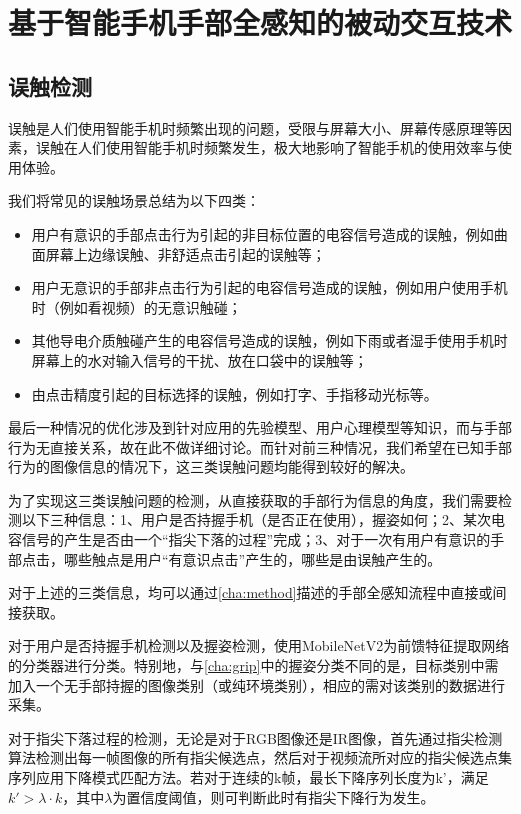 \chapter{基于智能手机手部全感知的被动交互技术}

\section{误触检测}
误触是人们使用智能手机时频繁出现的问题，受限与屏幕大小、屏幕传感原理等因素，误触在人们使用智能手机时频繁发生，极大地影响了智能手机的使用效率与使用体验。

我们将常见的误触场景总结为以下四类：
\begin{itemize}
    \item 用户有意识的手部点击行为引起的非目标位置的电容信号造成的误触，例如曲面屏幕上边缘误触、非舒适点击引起的误触等；
    \item 用户无意识的手部非点击行为引起的电容信号造成的误触，例如用户使用手机时（例如看视频）的无意识触碰；
    \item 其他导电介质触碰产生的电容信号造成的误触，例如下雨或者湿手使用手机时屏幕上的水对输入信号的干扰、放在口袋中的误触等；
    \item 由点击精度引起的目标选择的误触，例如打字、手指移动光标等。
\end{itemize}

最后一种情况的优化涉及到针对应用的先验模型、用户心理模型等知识，而与手部行为无直接关系，故在此不做详细讨论。而针对前三种情况，我们希望在已知手部行为的图像信息的情况下，这三类误触问题均能得到较好的解决。

为了实现这三类误触问题的检测，从直接获取的手部行为信息的角度，我们需要检测以下三种信息：1、用户是否持握手机（是否正在使用），握姿如何；2、某次电容信号的产生是否由一个“指尖下落的过程”完成；3、对于一次有用户有意识的手部点击，哪些触点是用户“有意识点击”产生的，哪些是由误触产生的。

对于上述的三类信息，均可以通过\ref{cha:method}描述的手部全感知流程中直接或间接获取。

对于用户是否持握手机检测以及握姿检测，使用MobileNetV2为前馈特征提取网络的分类器进行分类。特别地，与\ref{cha:grip}中的握姿分类不同的是，目标类别中需加入一个无手部持握的图像类别（或纯环境类别），相应的需对该类别的数据进行采集。

对于指尖下落过程的检测，无论是对于RGB图像还是IR图像，首先通过\label{cha:fingertip}指尖检测算法检测出每一帧图像的所有指尖候选点，然后对于视频流所对应的指尖候选点集序列应用下降模式匹配\label{cha:motion}方法。若对于连续的k帧，最长下降序列长度为k'，满足$k'>\lambda \cdot k$，其中$\lambda$为置信度阈值，则可判断此时有指尖下降行为发生。

